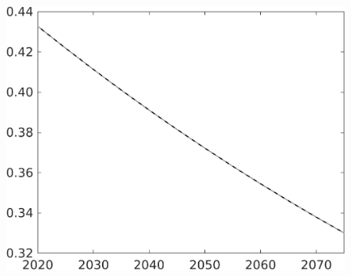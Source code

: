 \documentclass[12pt]{article}
\begin{document}
\begin{figure}[h!!]
\begin{minipage}[]{0.32\textwidth}
	\end{minipage}		
	\begin{minipage}[]{0.32\textwidth}
		\includegraphics[width=1\textwidth]{../../codding_model/own_basedOnFried/optimalPol_010922_revision/figures/all_13Sept22/CompTaul_Equlab_LFBAU_Reg0_LgLf_spillover0_nsk1_xgr0_knspil1_sep1_countec0_GovRev0_etaa0.79_lgd0.png}
	\end{minipage}	
\end{figure}
\end{document}
